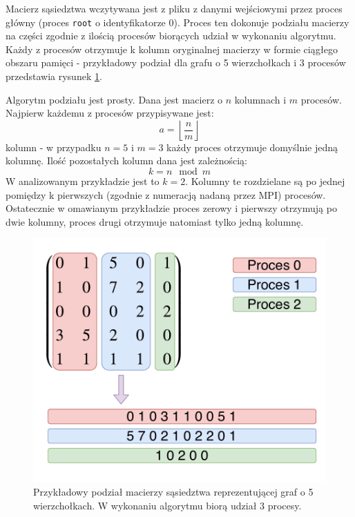 \documentclass[12pt]{article}
\begin{document}
Macierz sąsiedztwa wczytywana jest z pliku z danymi wejściowymi przez proces główny (proces \lstinline{root} o identyfikatorze 0). Proces ten dokonuje podziału macierzy na części zgodnie z ilością procesów biorących udział w wykonaniu algorytmu. Każdy z procesów otrzymuje k kolumn oryginalnej macierzy w formie ciągłego obszaru pamięci - przykładowy podział dla grafu o 5 wierzchołkach i 3 procesów przedstawia rysunek \ref{fig:am2}.

\vspace{5mm}
Algorytm podziału jest prosty. Dana jest macierz o $n$ kolumnach i $m$ procesów. Najpierw każdemu z procesów przypisywane jest:
\begin{equation}
a = \left\lfloor \frac{n}{m} \right\rfloor
\end{equation}
kolumn - w przypadku $n = 5$ i $m = 3$ każdy proces otrzymuje domyślnie jedną kolumnę. Ilość pozostałych kolumn dana jest zależnością:
\begin{equation}
k = n \mod m
\end{equation}
W analizowanym przykładzie jest to $k = 2$. Kolumny te rozdzielane są po jednej pomiędzy k pierwszych (zgodnie z numeracją nadaną przez MPI) procesów. Ostatecznie w omawianym przykładzie proces zerowy i pierwszy otrzymują po dwie kolumny, proces drugi otrzymuje natomiast tylko jedną kolumnę.

\begin{figure}[H]
\centering
\includegraphics[width=\textwidth]{static/MatrixSplit.pdf}
\caption{Przykładowy podział macierzy sąsiedztwa reprezentującej graf o 5 wierzchołkach. W wykonaniu algorytmu biorą udział 3 procesy.}
\label{fig:am2}
\end{figure}
\end{document}

